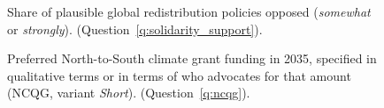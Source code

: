 \begin{figure}[h!]
    \caption[Share of plausible global policies opposed]{Share of plausible global redistribution policies opposed (\textit{somewhat} or \textit{strongly}). (Question~\ref{q:solidarity_support}).
    }\label{fig:share_solidarity_opposed}
\end{figure}

\begin{figure}[h!]
    \caption[Preferred NCQG]{Preferred North-to-South climate grant funding in 2035, specified in qualitative terms or in terms of who advocates for that amount (NCQG, variant \textit{Short}). (Question~\ref{q:ncqg}).
    }\label{fig:ncqg}
\end{figure}

